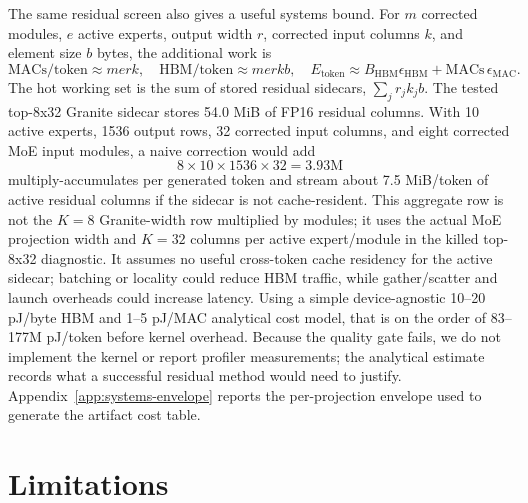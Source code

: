 \documentclass{article}
\begin{document}
The same residual screen also gives a useful systems bound. For $m$ corrected modules, $e$ active experts, output width $r$, corrected input columns $k$, and element size $b$ bytes, the additional work is
\[
  \mathrm{MACs/token} \approx m e r k,\quad
  \mathrm{HBM/token} \approx m e r k b,\quad
  E_{\mathrm{token}}\approx B_{\mathrm{HBM}}\epsilon_{\mathrm{HBM}}+\mathrm{MACs}\,\epsilon_{\mathrm{MAC}}.
\]
The hot working set is the sum of stored residual sidecars, $\sum_j r_j k_j b$. The tested top-8x32 Granite sidecar stores 54.0 MiB of FP16 residual columns. With 10 active experts, 1536 output rows, 32 corrected input columns, and eight corrected MoE input modules, a naive correction would add
\[
8 \times 10 \times 1536 \times 32 = 3.93\mathrm{M}
\]
multiply-accumulates per generated token and stream about 7.5 MiB/token of active residual columns if the sidecar is not cache-resident. This aggregate row is not the $K{=}8$ Granite-width row multiplied by modules; it uses the actual MoE projection width and $K{=}32$ columns per active expert/module in the killed top-8x32 diagnostic. It assumes no useful cross-token cache residency for the active sidecar; batching or locality could reduce HBM traffic, while gather/scatter and launch overheads could increase latency. Using a simple device-agnostic 10--20 pJ/byte HBM and 1--5 pJ/MAC analytical cost model, that is on the order of 83--177M pJ/token before kernel overhead. Because the quality gate fails, we do not implement the kernel or report profiler measurements; the analytical estimate records what a successful residual method would need to justify. Appendix~\ref{app:systems-envelope} reports the per-projection envelope used to generate the artifact cost table.

\section{Limitations}
\end{document}
